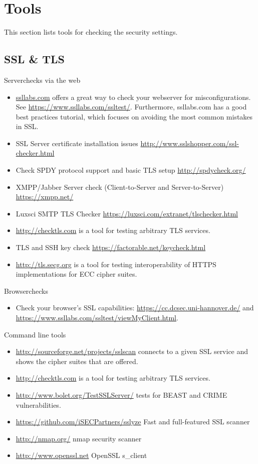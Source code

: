 \newpage
\section{Tools}
\label{section:Tools}
This section lists tools for checking the security settings.

\subsection{SSL \& TLS}

Serverchecks via the web
\begin{itemize}
\item \href{http://ssllabs.com}{ssllabs.com} offers a great way to check your webserver for misconfigurations. See \url{https://www.ssllabs.com/ssltest/}. Furthermore, ssllabs.com has a good best practices tutorial, which focuses on avoiding the most common mistakes in SSL.
\item SSL Server certificate installation issues \url{http://www.sslshopper.com/ssl-checker.html}
\item Check SPDY protocol support and basic TLS setup \url{http://spdycheck.org/}
\item XMPP/Jabber Server check (Client-to-Server and Server-to-Server) \url{https://xmpp.net/}
\item Luxsci SMTP TLS Checker \url{https://luxsci.com/extranet/tlschecker.html}
\item \url{http://checktls.com} is a tool for testing arbitrary TLS services.
\item TLS and SSH key check \url{https://factorable.net/keycheck.html}
\item \url{http://tls.secg.org} is a tool for testing interoperability of HTTPS implementations for ECC cipher suites.
\end{itemize}

Browserchecks
\begin{itemize}
\item Check your browser's SSL capabilities: \url{https://cc.dcsec.uni-hannover.de/} and \url{https://www.ssllabs.com/ssltest/viewMyClient.html}.
\end{itemize}


Command line tools
\begin{itemize}
\item \url{http://sourceforge.net/projects/sslscan} connects to a given SSL service and shows the cipher suites that are offered.
\item \url{http://checktls.com} is a tool for testing arbitrary TLS services. 
\item \url{http://www.bolet.org/TestSSLServer/} tests for BEAST and CRIME vulnerabilities.
\item \url{https://github.com/iSECPartners/sslyze} Fast and full-featured SSL scanner
\item \url{http://nmap.org/} nmap security scanner
\item \url{http://www.openssl.net} OpenSSL s\_client
\end{itemize}


